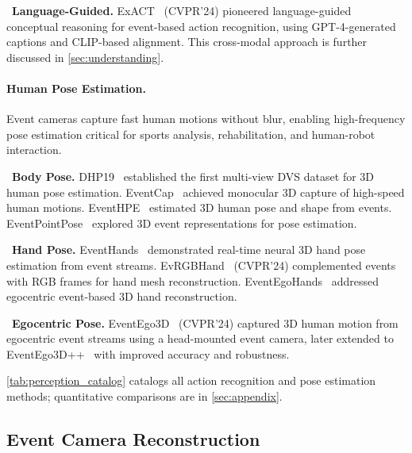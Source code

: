 \noindent{}~\textbf{Language-Guided.} ExACT~\cite{tang2024exact} (CVPR'24) pioneered language-guided conceptual reasoning for event-based action recognition, using GPT-4-generated captions and CLIP-based alignment. This cross-modal approach is further discussed in \cref{sec:understanding}.

\paragraph{Human Pose Estimation.}
Event cameras capture fast human motions without blur, enabling high-frequency pose estimation critical for sports analysis, rehabilitation, and human-robot interaction.

\noindent{}~\textbf{Body Pose.} DHP19~\cite{calabrese2019dhp19} established the first multi-view DVS dataset for 3D human pose estimation. EventCap~\cite{xu2020eventcap} achieved monocular 3D capture of high-speed human motions. EventHPE~\cite{zou2021eventhpe} estimated 3D human pose and shape from events. EventPointPose~\cite{wang2024eventpointpose} explored 3D event representations for pose estimation.

\noindent{}~\textbf{Hand Pose.} EventHands~\cite{rudnev2021eventhands} demonstrated real-time neural 3D hand pose estimation from event streams. EvRGBHand~\cite{jiang2024evrgbhand} (CVPR'24) complemented events with RGB frames for hand mesh reconstruction. EventEgoHands~\cite{li2025eventegohands} addressed egocentric event-based 3D hand reconstruction.

\noindent{}~\textbf{Egocentric Pose.} EventEgo3D~\cite{millerdurai2024eventego3d} (CVPR'24) captured 3D human motion from egocentric event streams using a head-mounted event camera, later extended to EventEgo3D++~\cite{millerdurai2025eventego3dpp} with improved accuracy and robustness.

\cref{tab:perception_catalog} catalogs all action recognition and pose estimation methods; quantitative comparisons are in \cref{sec:appendix}.




\subsection{Event Camera Reconstruction}
\label{sec:reconstruction}

